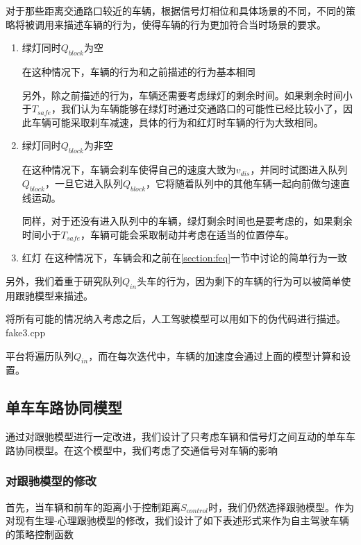 \documentclass[a4paper,UTF8]{paper}
\begin{document}
对于那些距离交通路口较近的车辆，根据信号灯相位和具体场景的不同，不同的策略将被调用来描述车辆的行为，使得车辆的行为更加符合当时场景的要求。

\begin{enumerate}
\item 绿灯同时$Q_{block}$为空

在这种情况下，车辆的行为和之前描述的行为基本相同

另外，除之前描述的行为，车辆还需要考虑绿灯的剩余时间。如果剩余时间小于$T_{safe}$，我们认为车辆能够在绿灯时通过交通路口的可能性已经比较小了，因此车辆可能采取刹车减速，具体的行为和红灯时车辆的行为大致相同。

\item 绿灯同时$Q_{block}$为非空

在这种情况下，车辆会刹车使得自己的速度大致为$v_{dis}$，并同时试图进入队列$Q_{block}$，一旦它进入队列$Q_{block}$，它将随着队列中的其他车辆一起向前做匀速直线运动。

同样，对于还没有进入队列中的车辆，绿灯剩余时间也是要考虑的，如果剩余时间小于$T_{safe}$，车辆可能会采取制动并考虑在适当的位置停车。

\item 红灯
在这种情况下，车辆会和之前在\ref{section:feq}一节中讨论的简单行为一致
\end{enumerate}

另外，我们着重于研究队列$Q_{in}$头车的行为，因为剩下的车辆的行为可以被简单使用跟驰模型来描述。

将所有可能的情况纳入考虑之后，人工驾驶模型可以用如下的伪代码进行描述。\\
 
 {fake3.cpp}

平台将遍历队列$Q_{in}$，而在每次迭代中，车辆的加速度会通过上面的模型计算和设置。

\subsection{单车车路协同模型}
\label{section:st1}

通过对跟驰模型进行一定改进，我们设计了只考虑车辆和信号灯之间互动的单车车路协同模型。在这个模型中，我们考虑了交通信号对车辆的影响

\subsubsection{对跟驰模型的修改}
首先，当车辆和前车的距离小于控制距离$S_{control}$时，我们仍然选择跟驰模型。作为对现有生理-心理跟驰模型的修改，我们设计了如下表述形式来作为自主驾驶车辆的策略控制函数
\end{document}

